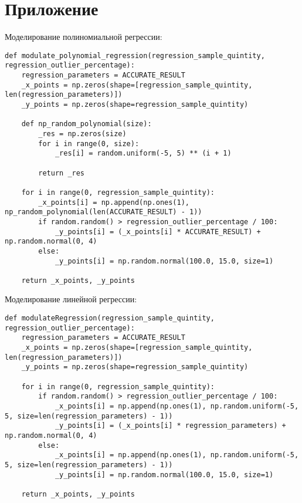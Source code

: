 \section*{Приложение}
{}

Моделирование полиномиальной регрессии:
\begin{Verbatim}[fontsize=\scriptsize]
def modulate_polynomial_regression(regression_sample_quintity, regression_outlier_percentage):
    regression_parameters = ACCURATE_RESULT
    _x_points = np.zeros(shape=[regression_sample_quintity, len(regression_parameters)])
    _y_points = np.zeros(shape=regression_sample_quintity)

    def np_random_polynomial(size):
        _res = np.zeros(size)
        for i in range(0, size):
            _res[i] = random.uniform(-5, 5) ** (i + 1)

        return _res

    for i in range(0, regression_sample_quintity):
        _x_points[i] = np.append(np.ones(1), np_random_polynomial(len(ACCURATE_RESULT) - 1))
        if random.random() > regression_outlier_percentage / 100:
            _y_points[i] = (_x_points[i] * ACCURATE_RESULT) + np.random.normal(0, 4)
        else:
            _y_points[i] = np.random.normal(100.0, 15.0, size=1)

    return _x_points, _y_points
\end{Verbatim}

Моделирование линейной регрессии:
\begin{Verbatim}[fontsize=\scriptsize]
    def modulateRegression(regression_sample_quintity, regression_outlier_percentage):
    regression_parameters = ACCURATE_RESULT
    _x_points = np.zeros(shape=[regression_sample_quintity, len(regression_parameters)])
    _y_points = np.zeros(shape=regression_sample_quintity)

    for i in range(0, regression_sample_quintity):
        if random.random() > regression_outlier_percentage / 100:
            _x_points[i] = np.append(np.ones(1), np.random.uniform(-5, 5, size=len(regression_parameters) - 1))
            _y_points[i] = (_x_points[i] * regression_parameters) + np.random.normal(0, 4)
        else:
            _x_points[i] = np.append(np.ones(1), np.random.uniform(-5, 5, size=len(regression_parameters) - 1))
            _y_points[i] = np.random.normal(100.0, 15.0, size=1)

    return _x_points, _y_points
\end{Verbatim}

